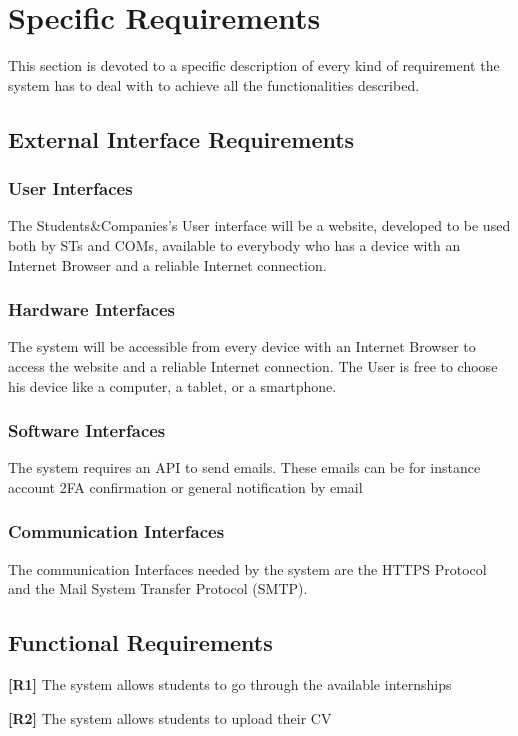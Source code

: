 \chapter{Specific Requirements}
This section is devoted to a specific description of every kind of requirement the system has to deal with to achieve all the functionalities described.

\section{External Interface Requirements}
\subsection{User Interfaces}
The Students\&Companies's User interface will be a website, developed to be used
both by STs and COMs, available to everybody who has a device with an Internet Browser
and a reliable Internet connection.

\subsection{Hardware Interfaces}
The system will be accessible from every device with an Internet Browser to access the
website and a reliable Internet connection.  The User is free to choose his device like a computer, a tablet, or a smartphone.

\subsection{Software Interfaces}
The system requires an API to send emails. These emails can be for instance account 2FA confirmation or general notification by email
 
\subsection{Communication Interfaces}
The communication Interfaces needed by the system are the HTTPS Protocol and the
Mail System Transfer Protocol (SMTP).

\section{Functional Requirements}
\textbf{[R1]} The system allows students to go through the available internships

\textbf{[R2]} The system allows students to upload their CV

